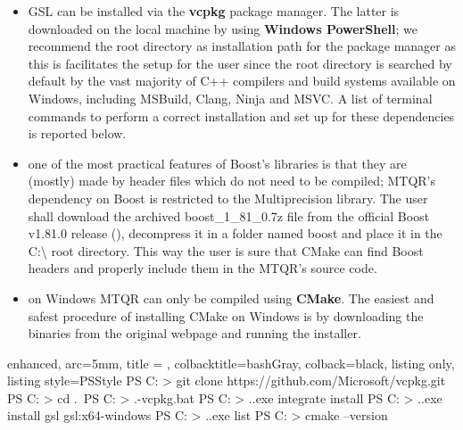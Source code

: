 \documentclass[a4paper, twosided]{book}
\begin{document}
\begin{itemize}
    \item GSL can be installed via the \color{poliDarkBlue} \textbf{vcpkg} package manager. The latter is downloaded on the local machine by using \color{poliDarkBlue} \textbf{Windows PowerShell}; we recommend the root directory as installation path for the package manager as this is facilitates the setup for the user since the root directory is searched by default by the vast majority of C++ compilers and build systems available on Windows, including MSBuild, Clang, Ninja and MSVC. A list of terminal commands to perform a correct installation and set up for these dependencies is reported below.

    \item one of the most practical features of Boost's libraries is that they are (mostly) made by header files which do not need to be compiled; MTQR's dependency on Boost is restricted to the Multiprecision library. The user shall download the archived \colorbox{poliGrayBlue}{boost\_1\_81\_0.7z} file from the official Boost v1.81.0 release (\cite{boost_release}), decompress it in a folder named \colorbox{poliGrayBlue}{boost} and place it in the \colorbox{poliGrayBlue}{C:\textbackslash} root directory. This way the user is sure that \colorbox{poliGrayBlue}{CMake} can find Boost headers and properly include them in the MTQR's source code.

    \item on Windows MTQR can only be compiled using \color{poliDarkBlue} \textbf{CMake}. The easiest and safest procedure of installing CMake on Windows is by downloading the binaries from the original webpage \cite{cmake} and running the installer.
\end{itemize}

\begin{tcblisting}{enhanced,
                    arc=5mm,
                    title = \color{black}{\large \ttfamily Installation of third-party libraries (Windows)},
                    colbacktitle=bashGray,
                    colback=black,
                    listing only,
                    listing style=PSStyle}
PS C: > git clone https://github.com/Microsoft/vcpkg.git
PS C: > cd .\vcpkg\
PS C: > .\bootstrap-vcpkg.bat
PS C: > .\vcpkg.exe integrate install
PS C: > .\vcpkg.exe install gsl gsl:x64-windows
PS C: > .\vcpkg.exe list
PS C: > cmake --version
\end{tcblisting}
\vspace{0.3cm}
\end{document}

